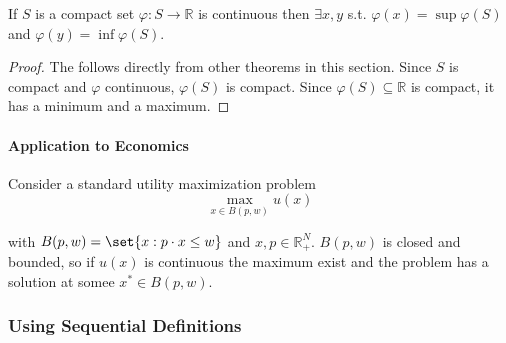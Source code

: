 \documentclass{article}
\begin{document}
\begin{theorem}\label{thm:lecture3_continuity_weierstrass_evt}
  If $S$ is a compact set $\varphi: S \to \mathbb{R}$ is continuous then $\exists x, y$ s.t. $\varphi(x) = \sup \varphi(S)$ and $\varphi(y) = \inf \varphi(S)$.
\end{theorem}

\begin{proof}
  The  follows directly from other theorems in this section. Since $S$ is compact and $\varphi$ continuous, $\varphi(S)$ is compact. Since $\varphi(S) \subseteq \mathbb{R}$ is compact, it has a minimum and a maximum.
\end{proof}

\paragraph{Application to Economics}
\label{par:application_to_economics}

Consider a standard utility maximization problem
\[
  \max_{x \in B(p, w)} u(x)
\]

with $B(p, w) = \set{x: p \cdot x \le w}$ and $x, p \in \mathbb{R}^N_+$. $B(p, w)$ is closed and bounded, so if $u(x)$ is continuous the maximum exist and the problem has a solution at somee $x^* \in B(p, w)$.

\subsubsection{Using Sequential Definitions}
\label{ssub:using_sequential_definitions}
\end{document}
